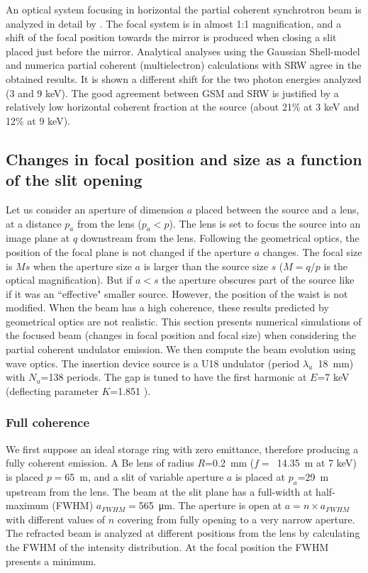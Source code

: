 \documentclass{iucr}              %
\begin{document}
An optical system focusing in horizontal the partial coherent synchrotron beam is analyzed in detail by \cite{westfahl}. The focal system is in almost 1:1 magnification, and a shift of the focal position towards the mirror is produced when closing a slit placed just before the mirror. Analytical analyses using the Gaussian Shell-model and numerica partial coherent (multielectron) calculations with SRW \cite{codeSRW} agree in the obtained results. It is shown a different shift for the two photon energies analyzed (3 and 9 keV). The good agreement between GSM and SRW is justified by a relatively low horizontal coherent fraction at the source (about 21\% at 3 keV and 12\% at 9 keV).
 
 
 \subsection{Changes in focal position and size as a function of the slit opening}
 
Let us consider an aperture of dimension $a$ placed between the source and a lens, at a distance $p_a$ from the lens ($p_a < p$). The lens is set to focus the source into an image plane at $q$ downstream from the lens. Following the geometrical optics, the position of the focal plane is not changed if the aperture $a$ changes. The focal size is $Ms$  when the aperture size $a$ is larger than the source size $s$ ($M=q/p$ is the optical magnification). But if $a<s$ the aperture obscures part of the source like if it was an ``effective" smaller source. However, the position of the waist is not modified. When the beam has a high coherence, these results predicted by geometrical optics are not realistic. This section presents numerical simulations of the focused beam (changes in focal position and focal size) when considering the partial coherent undulator emission. 
We then compute the beam evolution using wave optics. The insertion device source is a U18 undulator (period $\lambda_u$~\SI{18}{\milli\meter}) with $N_u$=138 periods. The gap is tuned to have the first harmonic at $E$=7 keV (deflecting parameter $K$=1.851 ). 

\subsubsection{Full coherence} We first suppose an ideal storage ring with zero emittance, therefore producing a fully coherent emission. A Be lens of radius $R$=\SI{0.2}{\milli\meter} ($f=$~\SI{14.35}{\meter} at 7 keV) is placed $p=$\SI{65}{\meter}, and a slit of variable aperture $a$ is placed at $p_a$=\SI{29}{\meter} upstream from the lens. The beam at the slit plane has a full-width at half-maximum (FWHM) $a_{FWHM}=$\SI{565}{\micro\meter}. The aperture is open at $a = n \times a_{FWHM}$ with different values of $n$ covering from fully opening to a very narrow aperture. The refracted beam is analyzed at different positions from the lens by calculating the FWHM of the intensity distribution. At the focal position the FWHM presents a minimum. 
\end{document}
